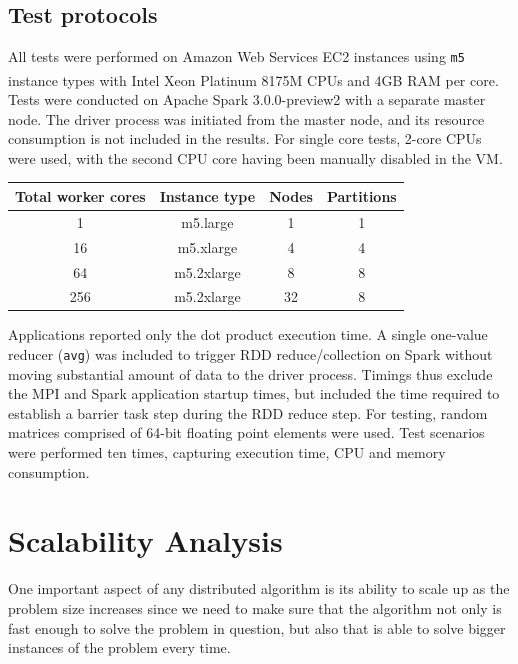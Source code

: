 \documentclass[fleqn,10pt]{SelfArx} %
\begin{document}
\subsection{Test protocols} %
\label{sub:test_protocols}

All tests were performed on Amazon Web Services EC2 instances using \texttt{m5} instance types with Intel\textsuperscript{\textregistered} Xeon\textsuperscript{\textregistered} Platinum 8175M CPUs and 4GB RAM per core. Tests were conducted on Apache Spark 3.0.0-preview2 with a separate master node. The driver process was initiated from the master node, and its resource consumption is not included in the results. For single core tests, 2-core CPUs were used, with the second CPU core having been manually disabled in the VM.



\begin{center}
	\begin{tabular}{ |c|c|c|c| } 
	 \hline
	 Total worker cores & Instance type & Nodes & Partitions  \\ 
	 \hline\hline
	 1 & m5.large & 1 & 1 \\ 
	 \hline
	 16 & m5.xlarge & 4 & 4 \\ 
	 \hline
	 64 & m5.2xlarge & 8 & 8 \\ 
	 \hline
	 256 & m5.2xlarge & 32 & 8 \\ 
	 \hline
	\end{tabular}
\end{center}
	
Applications reported only the dot product execution time. A single one-value reducer (\texttt{avg}) was included to trigger RDD reduce/collection on Spark without moving substantial amount of data to the driver process. Timings thus exclude the MPI and Spark application startup times, but included the time required to establish a barrier task step during the RDD reduce step. For testing, random matrices comprised of 64-bit floating point elements were used. Test scenarios were performed ten times, capturing execution time, CPU and memory consumption.


\section{Scalability Analysis} %
\label{sub:scalability_analysis}

One important aspect of any distributed algorithm is its ability to scale up as the problem size increases since we need to make sure that the algorithm not only is fast enough to solve the problem in question, but also that is able to solve bigger instances of the problem every time. 
\end{document}
